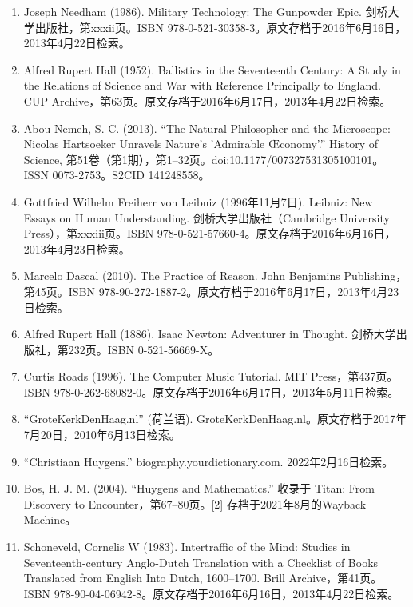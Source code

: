 \begin{enumerate}
\item Joseph Needham (1986). Military Technology: The Gunpowder Epic. 剑桥大学出版社，第xxxii页。ISBN 978-0-521-30358-3。原文存档于2016年6月16日，2013年4月22日检索。
\item Alfred Rupert Hall (1952). Ballistics in the Seventeenth Century: A Study in the Relations of Science and War with Reference Principally to England. CUP Archive，第63页。原文存档于2016年6月17日，2013年4月22日检索。
\item Abou-Nemeh, S. C. (2013). “The Natural Philosopher and the Microscope: Nicolas Hartsoeker Unravels Nature’s 'Admirable Œconomy'.” History of Science, 第51卷（第1期），第1–32页。doi:10.1177/007327531305100101。ISSN 0073-2753。S2CID 141248558。
\item Gottfried Wilhelm Freiherr von Leibniz (1996年11月7日). Leibniz: New Essays on Human Understanding. 剑桥大学出版社（Cambridge University Press），第xxxiii页。ISBN 978-0-521-57660-4。原文存档于2016年6月16日，2013年4月23日检索。
\item Marcelo Dascal (2010). The Practice of Reason. John Benjamins Publishing，第45页。ISBN 978-90-272-1887-2。原文存档于2016年6月17日，2013年4月23日检索。
\item Alfred Rupert Hall (1886). Isaac Newton: Adventurer in Thought. 剑桥大学出版社，第232页。ISBN 0-521-56669-X。
\item Curtis Roads (1996). The Computer Music Tutorial. MIT Press，第437页。ISBN 978-0-262-68082-0。原文存档于2016年6月17日，2013年5月11日检索。
\item “GroteKerkDenHaag.nl” (荷兰语). GroteKerkDenHaag.nl。原文存档于2017年7月20日，2010年6月13日检索。
\item “Christiaan Huygens.” biography.yourdictionary.com. 2022年2月16日检索。
\item Bos, H. J. M. (2004). “Huygens and Mathematics.” 收录于 Titan: From Discovery to Encounter，第67–80页。[2] 存档于2021年8月的Wayback Machine。

\item Schoneveld, Cornelis W (1983). Intertraffic of the Mind: Studies in Seventeenth-century Anglo-Dutch Translation with a Checklist of Books Translated from English Into Dutch, 1600–1700. Brill Archive，第41页。ISBN 978-90-04-06942-8。原文存档于2016年6月16日，2013年4月22日检索。


\end{enumerate}
